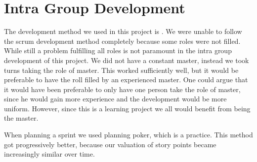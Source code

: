 \section{Intra Group Development}
\label{sec:intragroupdev}

The development method we used in this project is \scrum{}.
We were unable to follow the scrum development method completely because some roles were not filled.
While still a problem fulfilling all roles is not paramount in the intra group development of this project.
We did not have a constant \scrum{} master, instead we took turns taking the role of \scrum{} master.
This worked sufficiently well, but it would be preferable to have the roll filled by an experienced \scrum{} master.
One could argue that it would have been preferable to only have one person take the role of \scrum{} master, since he would gain more experience and the development would be more uniform.
However, since this is a learning project we all would benefit from being the \scrum{} master.

When planning a sprint we used planning poker, which is a \scrum{} practice.
This method got progressively better, because our valuation of story points became increasingly similar over time.




